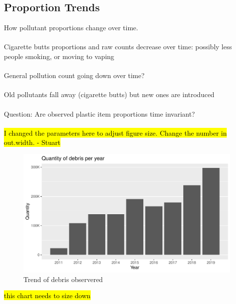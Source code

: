 \documentclass[10pt]{article}\usepackage[]{graphicx}\usepackage[]{color}
\newenvironment{knitrout}{}{} %
\begin{document}
\subsection{Proportion Trends}
How pollutant proportions change over time.\\
\\
Cigarette butts proportions and raw counts decrease over time: possibly less people smoking, or moving to vaping\\
\\
General pollution count going down over time?\\
\\
Old pollutants fall away (cigarette butts) but new ones are introduced\\
\\
Question: Are observed plastic item proportions time invariant?\\
\\
\hl{I changed the parameters here to adjust figure size. Change the number in out.width. - Stuart}
\begin{figure}[H] %
\begin{center}
\begin{knitrout}
\color{fgcolor}
\includegraphics[width=1\linewidth]{figure/unnamed-chunk-9-1} 

\end{knitrout}
\caption {Trend of debris observered}
\label{figD}
\end {center}
\end {figure}
\hl{this chart needs to size down}
\end{document}
